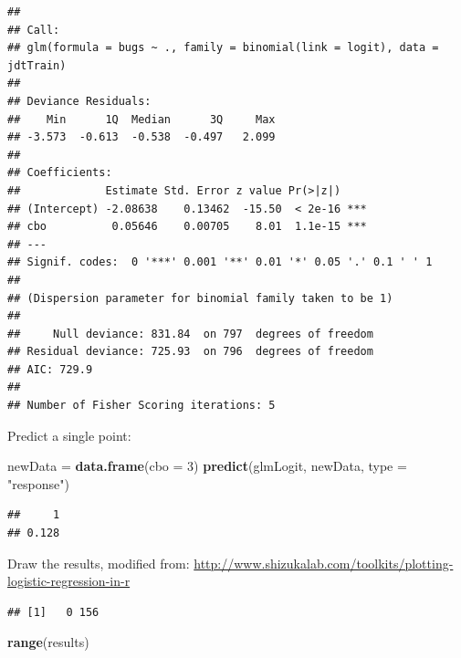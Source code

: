 \documentclass[]{book}
\newenvironment{Shaded}{\begin{snugshade}}{\end{snugshade}}
\newcommand{\KeywordTok}[1]{\textcolor[rgb]{0.13,0.29,0.53}{\textbf{{#1}}}}
\newcommand{\DataTypeTok}[1]{\textcolor[rgb]{0.13,0.29,0.53}{{#1}}}
\newcommand{\DecValTok}[1]{\textcolor[rgb]{0.00,0.00,0.81}{{#1}}}
\newcommand{\StringTok}[1]{\textcolor[rgb]{0.31,0.60,0.02}{{#1}}}
\newcommand{\NormalTok}[1]{{#1}}
\begin{document}
\begin{verbatim}
## 
## Call:
## glm(formula = bugs ~ ., family = binomial(link = logit), data = jdtTrain)
## 
## Deviance Residuals: 
##    Min      1Q  Median      3Q     Max  
## -3.573  -0.613  -0.538  -0.497   2.099  
## 
## Coefficients:
##             Estimate Std. Error z value Pr(>|z|)    
## (Intercept) -2.08638    0.13462  -15.50  < 2e-16 ***
## cbo          0.05646    0.00705    8.01  1.1e-15 ***
## ---
## Signif. codes:  0 '***' 0.001 '**' 0.01 '*' 0.05 '.' 0.1 ' ' 1
## 
## (Dispersion parameter for binomial family taken to be 1)
## 
##     Null deviance: 831.84  on 797  degrees of freedom
## Residual deviance: 725.93  on 796  degrees of freedom
## AIC: 729.9
## 
## Number of Fisher Scoring iterations: 5
\end{verbatim}

Predict a single point:

\begin{Shaded}
\begin{Highlighting}[]
\NormalTok{newData =}\StringTok{ }\KeywordTok{data.frame}\NormalTok{(}\DataTypeTok{cbo =} \DecValTok{3}\NormalTok{)}
\KeywordTok{predict}\NormalTok{(glmLogit, newData, }\DataTypeTok{type =} \StringTok{"response"}\NormalTok{)}
\end{Highlighting}
\end{Shaded}

\begin{verbatim}
##     1 
## 0.128
\end{verbatim}

Draw the results, modified from:
\url{http://www.shizukalab.com/toolkits/plotting-logistic-regression-in-r}

\begin{Shaded}
\end{Shaded}

\begin{verbatim}
## [1]   0 156
\end{verbatim}

\begin{Shaded}
\begin{Highlighting}[]
\KeywordTok{range}\NormalTok{(results)}
\end{Highlighting}
\end{Shaded}
\end{document}
